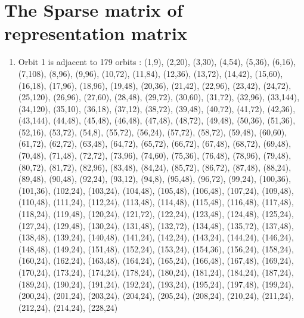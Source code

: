 \documentclass[12pt]{article}
\begin{document}
\section{The Sparse matrix of representation matrix}
\begin{enumerate}
\item Orbit 1 is adjacent to 179 orbits : (1,9), (2,20), (3,30), (4,54), (5,36), (6,16), (7,108), (8,96), (9,96), (10,72), (11,84), (12,36), (13,72), (14,42), (15,60), (16,18), (17,96), (18,96), (19,48), (20,36), (21,42), (22,96), (23,42), (24,72), (25,120), (26,96), (27,60), (28,48), (29,72), (30,60), (31,72), (32,96), (33,144), (34,120), (35,10), (36,18), (37,12), (38,72), (39,48), (40,72), (41,72), (42,36), (43,144), (44,48), (45,48), (46,48), (47,48), (48,72), (49,48), (50,36), (51,36), (52,16), (53,72), (54,8), (55,72), (56,24), (57,72), (58,72), (59,48), (60,60), (61,72), (62,72), (63,48), (64,72), (65,72), (66,72), (67,48), (68,72), (69,48), (70,48), (71,48), (72,72), (73,96), (74,60), (75,36), (76,48), (78,96), (79,48), (80,72), (81,72), (82,96), (83,48), (84,24), (85,72), (86,72), (87,48), (88,24), (89,48), (90,48), (92,24), (93,12), (94,8), (95,48), (96,72), (99,24), (100,36), (101,36), (102,24), (103,24), (104,48), (105,48), (106,48), (107,24), (109,48), (110,48), (111,24), (112,24), (113,48), (114,48), (115,48), (116,48), (117,48), (118,24), (119,48), (120,24), (121,72), (122,24), (123,48), (124,48), (125,24), (127,24), (129,48), (130,24), (131,48), (132,72), (134,48), (135,72), (137,48), (138,48), (139,24), (140,48), (141,24), (142,24), (143,24), (144,24), (146,24), (148,48), (149,24), (151,48), (152,24), (153,24), (154,36), (156,24), (158,24), (160,24), (162,24), (163,48), (164,24), (165,24), (166,48), (167,48), (169,24), (170,24), (173,24), (174,24), (178,24), (180,24), (181,24), (184,24), (187,24), (189,24), (190,24), (191,24), (192,24), (193,24), (195,24), (197,48), (199,24), (200,24), (201,24), (203,24), (204,24), (205,24), (208,24), (210,24), (211,24), (212,24), (214,24), (228,24)

\end{enumerate}
\end{document}
